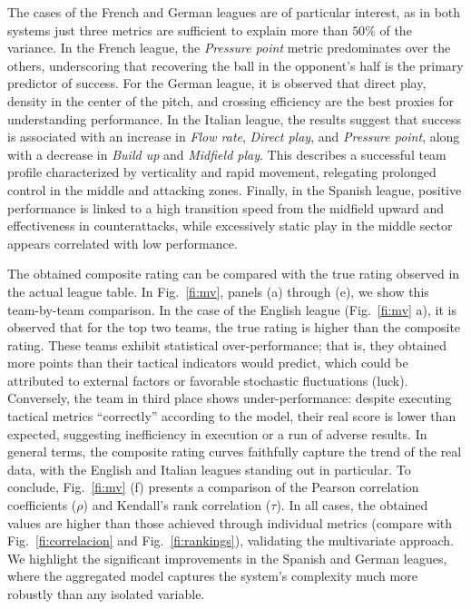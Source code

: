 \documentclass[preprint,12pt]{elsarticle}
\begin{document}
{The cases of the French and German leagues are of particular interest, as in both systems just three metrics are sufficient to explain more than $50\%$ of the variance. In the French league, the {\it Pressure point} metric predominates over the others, underscoring that recovering the ball in the opponent's half is the primary predictor of success. For the German league, it is observed that direct play, density in the center of the pitch, and crossing efficiency are the best proxies for understanding performance.
%
In the Italian league, the results suggest that success is associated with an increase in {\it Flow rate}, {\it Direct play}, and {\it Pressure point}, along with a decrease in {\it Build up} and {\it Midfield play}. This describes a successful team profile characterized by verticality and rapid movement, relegating prolonged control in the middle and attacking zones. Finally, in the Spanish league, positive performance is linked to a high transition speed from the midfield upward and effectiveness in counterattacks, while excessively static play in the middle sector appears correlated with low performance.

The obtained composite rating can be compared with the true rating observed in the actual league table. In Fig.~\ref{fi:mv}, panels (a) through (e), we show this team-by-team comparison. In the case of the English league (Fig.~\ref{fi:mv} a), it is observed that for the top two teams, the true rating is higher than the composite rating. These teams exhibit statistical over-performance; that is, they obtained more points than their tactical indicators would predict, which could be attributed to external factors or favorable stochastic fluctuations (luck). Conversely, the team in third place shows under-performance: despite executing tactical metrics ``correctly'' according to the model, their real score is lower than expected, suggesting inefficiency in execution or a run of adverse results.
%
In general terms, the composite rating curves faithfully capture the trend of the real data, with the English and Italian leagues standing out in particular. To conclude, Fig.~\ref{fi:mv} (f) presents a comparison of the Pearson correlation coefficients ($\rho$) and Kendall's rank correlation ($\tau$). In all cases, the obtained values are higher than those achieved through individual metrics (compare with Fig.~\ref{fi:correlacion} and Fig.~\ref{fi:rankings}), validating the multivariate approach. We highlight the significant improvements in the Spanish and German leagues, where the aggregated model captures the system's complexity much more robustly than any isolated variable.
}
\end{document}

